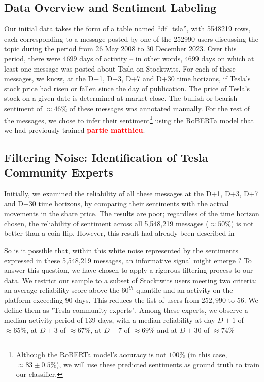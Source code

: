 \documentclass{article}
\begin{document}
\subsection{Data Overview and Sentiment Labeling}
Our initial data takes the form of a table named “df\_tsla”, with 5548219 rows, each corresponding to a message posted by one of the 252990 users discussing the topic during the period from 26 May 2008 to 30 December 2023. Over this period, there were 4699 days of activity – in other words, 4699 days on which at least one message was posted about Tesla on Stocktwits. For each of these messages, we know, at the D+1, D+3, D+7 and D+30 time horizons, if Tesla's stock price had risen or fallen since the day of publication. The price of Tesla's stock on a given date is determined at market close. The bullish or bearish sentiment of $\approx 46\%$ of these messages was annotated manually. For the rest of the messages, we chose to infer their sentiment\footnote{Although the RoBERTa model’s accuracy is not $100\%$ (in this case, $\approx 83\pm 0.5\%$), we will use these predicted sentiments as ground truth to train our classifier.} using the RoBERTa model that we had previously trained \textcolor{red}{\textbf{partie matthieu}}.

\subsection{Filtering Noise: Identification of Tesla Community Experts}
Initially, we examined the reliability of all these messages at the D+1, D+3, D+7 and D+30 time horizons, by comparing their sentiments with the actual movements in the share price. The results are poor; regardless of the time horizon chosen, the reliability of sentiment across all 5,548,219 messages ($\approx 50\%$) is not better than a coin flip. However, this result had already been described in \cite{Li2025}

So is it possible that, within this white noise represented by the sentiments expressed in these 5,548,219 messages, an informative signal might emerge ? To answer this question, we have chosen to apply a rigorous filtering process to our data. We restrict our sample to a subset of Stocktwits users meeting two criteria: an average reliability score above the $60^{th}$ quantile and an activity on the platform exceeding 90 days. This reduces the list of users from $252,990$ to $56$. We define them as "Tesla community experts". Among these experts, we observe a median activity period of 139 days, with a median reliability at day $D+1$ of $\approx 65\%$, at $D+3$ of $\approx 67\%$, at $D+7$ of $\approx 69\%$ and at $D+30$ of $\approx 74\%$
\end{document}
